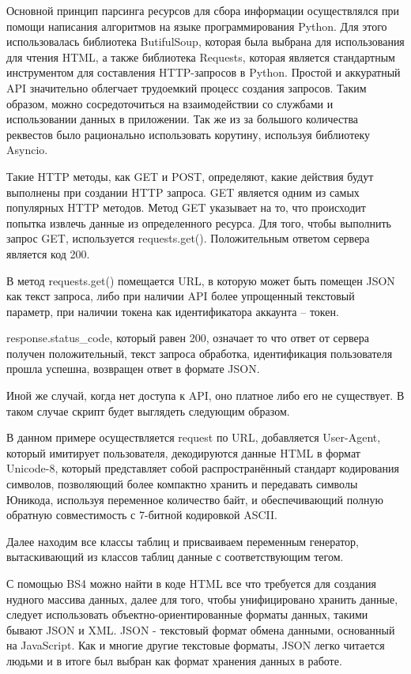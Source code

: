 Основной принцип парсинга ресурсов для сбора информации осуществлялся при помощи написания алгоритмов на языке программирования Python. Для этого использовалась библиотека ButifulSoup, которая была выбрана для использования для чтения HTML, а также библиотека Requests, которая является стандартным инструментом для составления HTTP-запросов в Python. Простой и аккуратный API значительно облегчает трудоемкий процесс создания запросов. Таким образом, можно сосредоточиться на взаимодействии со службами и использовании данных в приложении. Так же из за большого количества реквестов было рационально использовать корутину, используя библиотеку Asyncio.

Такие HTTP методы, как GET и POST, определяют, какие действия будут выполнены при создании HTTP запроса. 
GET является одним из самых популярных HTTP методов. Метод GET указывает на то, что происходит попытка извлечь 
данные из определенного ресурса. Для того, чтобы выполнить запрос GET, используется requests.get(). 
Положительным ответом сервера является код 200. 

В метод requests.get() помещается URL, в которую может быть помещен JSON как текст запроса, либо при наличии 
API более упрощенный текстовый параметр, при наличии  токена как идентификатора аккаунта – токен.

response.status\_code, который равен 200, означает то что ответ от сервера получен положительный, 
текст запроса обработка, идентификация пользователя прошла успешна, возвращен ответ в формате JSON.

Иной же случай, когда нет доступа к API, оно платное либо его не существует. 
В таком случае скрипт будет выглядеть следующим образом.

В данном примере осуществляется request по URL, добавляется User-Agent, который имитирует пользователя, 
декодируются данные HTML в формат Unicode-8, который представляет собой распространённый стандарт 
кодирования символов, позволяющий более компактно хранить и передавать символы Юникода, используя 
переменное количество байт, и обеспечивающий полную обратную совместимость с 7-битной кодировкой ASCII.

Далее находим все классы таблиц и присваиваем переменным генератор, вытаскивающий 
из классов таблиц данные с соответствующим тегом.

С помощью BS4 можно найти в коде HTML все что требуется для создания нудного массива данных, 
далее для того, чтобы унифицировано хранить данные, следует использовать объектно-ориентированные форматы 
данных, такими бывают JSON и XML. JSON - текстовый формат обмена данными, основанный на JavaScript. 
Как и многие другие текстовые форматы, JSON легко читается людьми и в итоге был выбран как формат хранения данных в работе.

